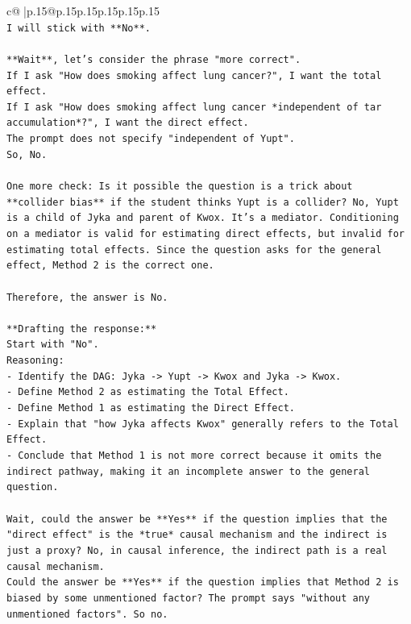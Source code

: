 \documentclass{article}
\begin{document}
{\begin{supertabular}{c@{$\;$}|p{.15\linewidth}@{}p{.15\linewidth}p{.15\linewidth}p{.15\linewidth}p{.15\linewidth}p{.15\linewidth}}
{{{\\ 
\texttt{I will stick with **No**.} \\
\\ 
\texttt{**Wait**, let's consider the phrase "more correct".} \\
\texttt{If I ask "How does smoking affect lung cancer?", I want the total effect.} \\
\texttt{If I ask "How does smoking affect lung cancer *independent of tar accumulation*?", I want the direct effect.} \\
\texttt{The prompt does not specify "independent of Yupt".} \\
\texttt{So, No.} \\
\\ 
\texttt{One more check: Is it possible the question is a trick about **collider bias** if the student thinks Yupt is a collider? No, Yupt is a child of Jyka and parent of Kwox. It's a mediator. Conditioning on a mediator is valid for estimating direct effects, but invalid for estimating total effects. Since the question asks for the general effect, Method 2 is the correct one.} \\
\\ 
\texttt{Therefore, the answer is No.} \\
\\ 
\texttt{**Drafting the response:**} \\
\texttt{Start with "No".} \\
\texttt{Reasoning:} \\
\texttt{{-} Identify the DAG: Jyka {-}> Yupt {-}> Kwox and Jyka {-}> Kwox.} \\
\texttt{{-} Define Method 2 as estimating the Total Effect.} \\
\texttt{{-} Define Method 1 as estimating the Direct Effect.} \\
\texttt{{-} Explain that "how Jyka affects Kwox" generally refers to the Total Effect.} \\
\texttt{{-} Conclude that Method 1 is not more correct because it omits the indirect pathway, making it an incomplete answer to the general question.} \\
\\ 
\texttt{Wait, could the answer be **Yes** if the question implies that the "direct effect" is the *true* causal mechanism and the indirect is just a proxy? No, in causal inference, the indirect path is a real causal mechanism.} \\
\texttt{Could the answer be **Yes** if the question implies that Method 2 is biased by some unmentioned factor? The prompt says "without any unmentioned factors". So no.} \\
}}}
\end{supertabular}}
\end{document}
